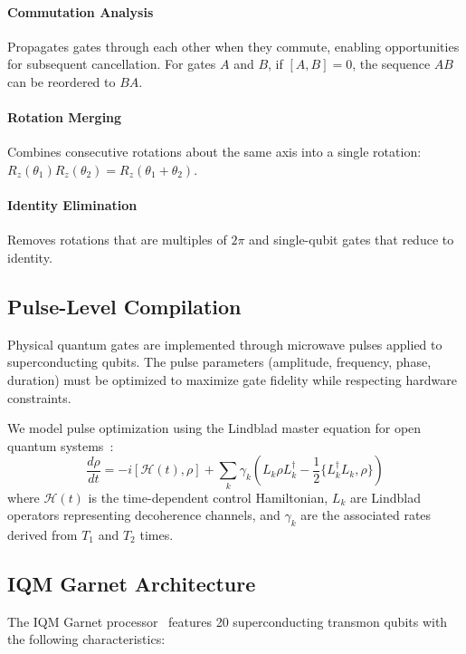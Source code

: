 \documentclass[twocolumn,showpacs,preprintnumbers,amsmath,amssymb,prb]{revtex4-2}
\newcommand{\ham}{\mathcal{H}}
\begin{document}
\paragraph{Commutation Analysis} Propagates gates through each other when they commute, enabling opportunities for subsequent cancellation. For gates $A$ and $B$, if $[A, B] = 0$, the sequence $AB$ can be reordered to $BA$.

\paragraph{Rotation Merging} Combines consecutive rotations about the same axis into a single rotation: $R_z(\theta_1)R_z(\theta_2) = R_z(\theta_1 + \theta_2)$.

\paragraph{Identity Elimination} Removes rotations that are multiples of $2\pi$ and single-qubit gates that reduce to identity.

\subsection{Pulse-Level Compilation}

Physical quantum gates are implemented through microwave pulses applied to superconducting qubits. The pulse parameters (amplitude, frequency, phase, duration) must be optimized to maximize gate fidelity while respecting hardware constraints.

We model pulse optimization using the Lindblad master equation for open quantum systems~\cite{lindblad1976generators}:
\begin{equation}
    \frac{d\rho}{dt} = -i[\ham(t), \rho] + \sum_k \gamma_k \left( L_k \rho L_k^{\dagger} - \frac{1}{2}\{L_k^{\dagger}L_k, \rho\} \right)
\end{equation}
where $\ham(t)$ is the time-dependent control Hamiltonian, $L_k$ are Lindblad operators representing decoherence channels, and $\gamma_k$ are the associated rates derived from $T_1$ and $T_2$ times.

\subsection{IQM Garnet Architecture}

The IQM Garnet processor~\cite{iqm2024garnet} features 20 superconducting transmon qubits with the following characteristics:
\end{document}
